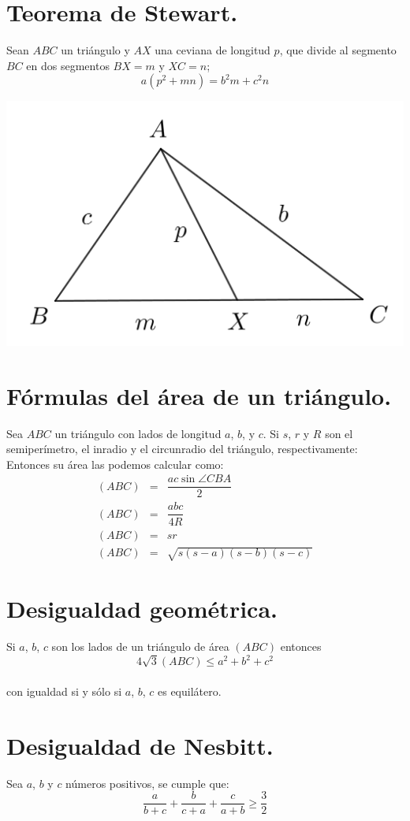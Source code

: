 \documentclass[12pt,a4paper,oneside]{book}
\begin{document}
\section{Teorema de Stewart.}
Sean $ABC$ un triángulo y $AX$ una ceviana de longitud $p$, que divide al segmento $BC$ en dos segmentos $BX=m$ y $XC=n$; $$a(p^2 +mn) = b^2m + c^2n$$
\begin{center}
\includegraphics[scale=0.6]{Imagenes/stewart.png} 
\end{center}
\section{Fórmulas del área de un triángulo.}
Sea $ABC$ un triángulo con lados de longitud $a$, $b$, y $c$. Si $s$, $r$ y $R$ son el semiperímetro, el inradio y el circunradio del triángulo, respectivamente: Entonces su área las podemos calcular como:
\begin{eqnarray*}
(ABC)&=& \dfrac{ac \sin \angle CBA}{2}
\\(ABC)&=& \dfrac{abc}{4R}
\\(ABC)&=& sr
\\(ABC)&=& \sqrt{s(s-a)(s-b)(s-c)}
\end{eqnarray*}
\section{Desigualdad geométrica.}
Si $a$, $b$, $c$ son los lados de un triángulo de área $(ABC)$ entonces $$4\sqrt{3}(ABC) \leq a^2 + b^2 + c^2$$
\\con igualdad si y sólo si $a$, $b$, $c$ es equilátero.
\section{Desigualdad de Nesbitt.}
Sea $a$, $b$ y $c$ números positivos, se cumple que:
$$\dfrac{a}{b+c} + \dfrac{b}{c+a}+ \dfrac{c}{a+b} \geq \dfrac{3}{2}$$
\end{document}
